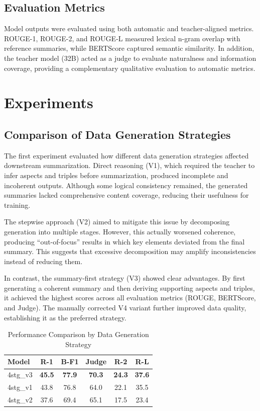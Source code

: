\documentclass[preprint,12pt]{elsarticle}
\begin{document}
\subsection{Evaluation Metrics}
Model outputs were evaluated using both automatic and teacher-aligned metrics. ROUGE-1, ROUGE-2, and ROUGE-L measured lexical n-gram overlap with reference summaries, while BERTScore \cite{DBLP:journals/corr/abs-1904-09675} captured semantic similarity.
In addition, the teacher model (32B) acted as a judge to evaluate naturalness and information coverage, providing a complementary qualitative evaluation to automatic metrics.

\section{Experiments}

\subsection{Comparison of Data Generation Strategies}
The first experiment evaluated how different data generation strategies affected downstream summarization.  
Direct reasoning (V1), which required the teacher to infer aspects and triples before summarization, produced incomplete and incoherent outputs.  
Although some logical consistency remained, the generated summaries lacked comprehensive content coverage, reducing their usefulness for training.

The stepwise approach (V2) aimed to mitigate this issue by decomposing generation into multiple stages. However, this actually worsened coherence, producing “out-of-focus” results in which key elements deviated from the final summary. This suggests that excessive decomposition may amplify inconsistencies instead of reducing them.

In contrast, the summary-first strategy (V3) showed clear advantages. By first generating a coherent summary and then deriving supporting aspects and triples, it achieved the highest scores across all evaluation metrics (ROUGE, BERTScore, and Judge).  
The manually corrected V4 variant further improved data quality, establishing it as the preferred strategy.

\begin{table}[t]
\centering
\begin{tabular}{lccccc}
\hline
Model & R-1 & B-F1 & Judge & R-2 & R-L \\
\hline
4stg\_v3 & \textbf{45.5} & \textbf{77.9} & \textbf{70.3} & \textbf{24.3} & \textbf{37.6} \\
4stg\_v1 & 43.8 & 76.8 & 64.0 & 22.1 & 35.5 \\
4stg\_v2 & 37.6 & 69.4 & 65.1 & 17.5 & 23.4 \\
\hline
\end{tabular}
\caption{Performance Comparison by Data Generation Strategy}\label{strategy_comparison}
\end{table}
\end{document}
